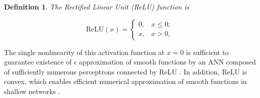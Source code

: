 \documentclass[10pt]{extarticle}
\newtheorem{definition}[theorem]{Definition}
\newcommand{\R}{\mathbb{R}}
\newcommand{\relu}{\text{ReLU}}
\newcounter{col}
\begin{document}
\begin{definition}{The Rectified Linear Unit (ReLU) function is}
\label{relu}

  \[\relu(x) = \begin{cases} 0, & x \leq 0;\\
      x, & x > 0,\end{cases}\]
\end{definition}


The single nonlinearity of this activation function
at $x = 0$ is sufficient to guarantee existence of $\epsilon$ approximation of smooth functions by an ANN composed of sufficiently numerous perceptrons connected by ReLU \cite{petersen2018optimal}. In addition, ReLU is convex, which enables efficient numerical approximation of smooth functions in shallow networks  \cite{li2017convergence}.  






\end{document}
